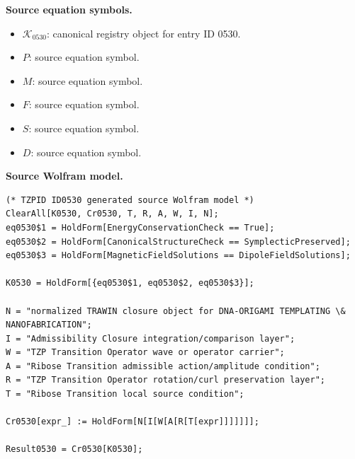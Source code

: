 \begin{minipage}[t]{0.49\linewidth}
\begingroup
\small
\raggedright
\textbf{Source equation symbols.}\par
\begin{itemize}[leftmargin=1.35em,itemsep=1pt,topsep=1pt,parsep=0pt]
    \item $\mathcal{K}_{0530}$: canonical registry object for entry ID 0530.
    \item $P$: source equation symbol.
    \item $M$: source equation symbol.
    \item $F$: source equation symbol.
    \item $S$: source equation symbol.
    \item $D$: source equation symbol.
\end{itemize}
\endgroup
\end{minipage}\hfill
\begin{minipage}[t]{0.47\linewidth}
\begingroup
\scriptsize
\raggedright
\textbf{Source Wolfram model.}\par
\begin{Verbatim}[fontsize=\tiny,breaklines=true,breakanywhere=true]
(* TZPID ID0530 generated source Wolfram model *)
ClearAll[K0530, Cr0530, T, R, A, W, I, N];
eq0530$1 = HoldForm[EnergyConservationCheck == True];
eq0530$2 = HoldForm[CanonicalStructureCheck == SymplecticPreserved];
eq0530$3 = HoldForm[MagneticFieldSolutions == DipoleFieldSolutions];

K0530 = HoldForm[{eq0530$1, eq0530$2, eq0530$3}];

N = "normalized TRAWIN closure object for DNA-ORIGAMI TEMPLATING \& NANOFABRICATION";
I = "Admissibility Closure integration/comparison layer";
W = "TZP Transition Operator wave or operator carrier";
A = "Ribose Transition admissible action/amplitude condition";
R = "TZP Transition Operator rotation/curl preservation layer";
T = "Ribose Transition local source condition";

Cr0530[expr_] := HoldForm[N[I[W[A[R[T[expr]]]]]]];

Result0530 = Cr0530[K0530];
\end{Verbatim}
\endgroup
\end{minipage}

